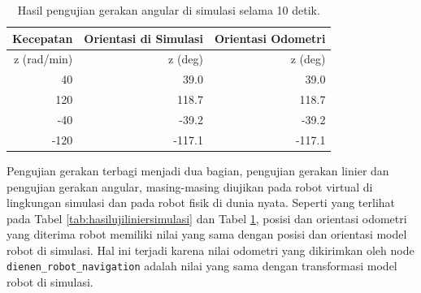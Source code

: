 \begin{table}
  \caption{Hasil pengujian gerakan angular di simulasi selama 10 detik.}
  \label{tab:hasilujiangularsimulasi}
  \centering
  \begin{tabular}{r|r|r}
    \toprule
    Kecepatan   & Orientasi di Simulasi & Orientasi Odometri \\
    \midrule
    z (rad/min) & z (deg)               & z (deg) \\
    \midrule
    40          & 39.0                  & 39.0 \\
    120         & 118.7                 & 118.7 \\
    -40         & -39.2                 & -39.2 \\
    -120        & -117.1                & -117.1 \\
    \bottomrule
  \end{tabular}
\end{table}

Pengujian gerakan terbagi menjadi dua bagian, pengujian gerakan linier dan pengujian gerakan angular, masing-masing diujikan pada robot virtual di lingkungan simulasi dan pada robot fisik di dunia nyata.
Seperti yang terlihat pada Tabel \ref{tab:hasilujiliniersimulasi} dan Tabel \ref{tab:hasilujiangularsimulasi}, posisi dan orientasi odometri yang diterima robot memiliki nilai yang sama dengan posisi dan orientasi model robot di simulasi.
Hal ini terjadi karena nilai odometri yang dikirimkan oleh node \lstinline{dienen_robot_navigation} adalah nilai yang sama dengan transformasi model robot di simulasi.

